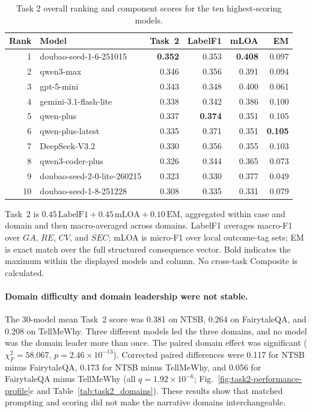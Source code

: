 \documentclass[pdflatex,sn-mathphys-num]{sn-jnl}%
\theoremstyle{thmstyleone}%
\theoremstyle{thmstyletwo}%
\theoremstyle{thmstylethree}%
\begin{document}
\begin{table}[p]
\centering
\caption{Task 2 overall ranking and component scores for the ten highest-scoring models.}
\label{tab:task2_top10}
\small
\setlength{\tabcolsep}{6.0pt}
\begin{tabular}{rlrrrr}
\toprule
Rank & Model & Task~2 & LabelF1 & mLOA & EM \\
\midrule
1 & doubao-seed-1-6-251015 & \textbf{0.352} & 0.353 & \textbf{0.408} & 0.097 \\
2 & qwen3-max & 0.346 & 0.356 & 0.391 & 0.094 \\
3 & gpt-5-mini & 0.343 & 0.348 & 0.400 & 0.061 \\
4 & gemini-3.1-flash-lite & 0.338 & 0.342 & 0.386 & 0.100 \\
5 & qwen-plus & 0.337 & \textbf{0.374} & 0.351 & 0.105 \\
6 & qwen-plus-latest & 0.335 & 0.371 & 0.351 & \textbf{0.105} \\
7 & DeepSeek-V3.2 & 0.330 & 0.356 & 0.355 & 0.103 \\
8 & qwen3-coder-plus & 0.326 & 0.344 & 0.365 & 0.073 \\
9 & doubao-seed-2-0-lite-260215 & 0.323 & 0.330 & 0.377 & 0.049 \\
10 & doubao-seed-1-8-251228 & 0.308 & 0.335 & 0.331 & 0.079 \\
\bottomrule
\end{tabular}
\begin{minipage}{0.98\textwidth}
\footnotesize
Task~2 is $0.45\,\mathrm{LabelF1}+0.45\,\mathrm{mLOA}+0.10\,\mathrm{EM}$, aggregated within case and domain and then macro-averaged across domains. LabelF1 averages macro-F1 over $GA$, $RE$, $CV$, and $SEC$; mLOA is micro-F1 over local outcome-tag sets; EM is exact match over the full structured consequence vector. Bold indicates the maximum within the displayed models and column. No cross-task Composite is calculated.
\end{minipage}
\end{table}

\paragraph{Domain difficulty and domain leadership were not stable.}
The 30-model mean Task~2 score was 0.381 on NTSB, 0.264 on FairytaleQA, and 0.208 on TellMeWhy. Three different models led the three domains, and no model was the domain leader more than once. The paired domain effect was significant ($\chi_F^2=58.067$, $p=2.46\times10^{-13}$). Corrected paired differences were 0.117 for NTSB minus FairytaleQA, 0.173 for NTSB minus TellMeWhy, and 0.056 for FairytaleQA minus TellMeWhy (all $q=1.92\times10^{-6}$; Fig.~\ref{fig:task2-performance-profile}c and Table~\ref{tab:task2_domains}). These results show that matched prompting and scoring did not make the narrative domains interchangeable.
\end{document}

